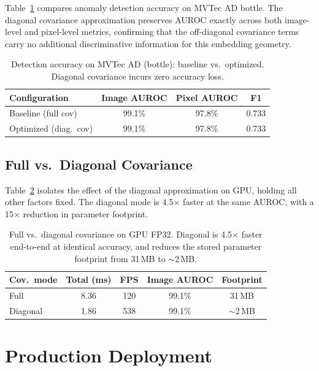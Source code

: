\documentclass[blind]{gtac}
\begin{document}
Table~\ref{tab:accuracy} compares anomaly detection accuracy on MVTec AD bottle.
The diagonal covariance approximation preserves AUROC exactly across both
image-level and pixel-level metrics, confirming that the off-diagonal covariance
terms carry no additional discriminative information for this embedding geometry.

\begin{table}[H]
\centering
\caption{Detection accuracy on MVTec AD (bottle): baseline vs.\ optimized.
Diagonal covariance incurs zero accuracy loss.}
\label{tab:accuracy}
\footnotesize
\begin{tabular}{@{}lccc@{}}
\toprule
Configuration           & Image AUROC & Pixel AUROC & F1    \\
\midrule
Baseline (full cov)     & 99.1\%      & 97.8\%      & 0.733 \\
Optimized (diag.\ cov)  & 99.1\%      & 97.8\%      & 0.733 \\
\bottomrule
\end{tabular}
\end{table}

\subsection{Full vs.\ Diagonal Covariance}

Table~\ref{tab:covmode} isolates the effect of the diagonal approximation on
GPU, holding all other factors fixed.  The diagonal mode is 4.5$\times$ faster
at the same AUROC, with a 15$\times$ reduction in parameter footprint.

\begin{table}[H]
\centering
\caption{Full vs.\ diagonal covariance on GPU FP32.  Diagonal is 4.5$\times$
faster end-to-end at identical accuracy, and reduces the stored parameter
footprint from 31\,MB to $\sim$2\,MB.}
\label{tab:covmode}
\footnotesize
\begin{tabular}{@{}lcccc@{}}
\toprule
Cov.\ mode & Total (ms) & FPS & Image AUROC & Footprint \\
\midrule
Full       & 8.36   & 120 & 99.1\% & 31\,MB \\
Diagonal   & 1.86   & 538 & 99.1\% & $\sim$2\,MB \\
\bottomrule
\end{tabular}
\end{table}

\section{Production Deployment}
\label{sec:deployment}
\end{document}
